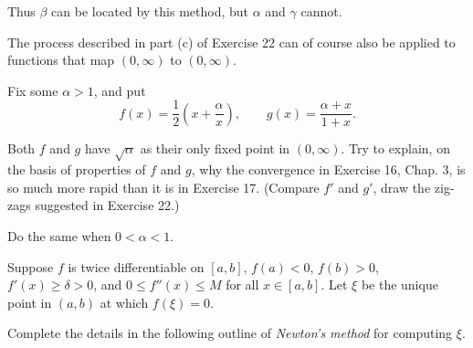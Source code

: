 \begin{questions}

  Thus $\beta$ can be located by this method, but $\alpha$ and $\gamma$ cannot.

  \question The process described in part (c) of Exercise 22 can of course also be applied to functions that map $(0,\infty)$ to $(0,\infty)$.

  Fix some $\alpha>1$, and put
  \[ f(x) = \frac{1}{2}\left( x + \frac{\alpha}{x} \right), \qquad g(x) = \frac{\alpha+x}{1+x}. \]

  Both $f$ and $g$ have $\sqrt{\alpha}$ as their only fixed point in $(0,\infty)$. Try to explain, on the basis of properties of $f$ and $g$, why the convergence in Exercise 16, Chap. 3, is so much more rapid than it is in Exercise 17. (Compare $f'$ and $g'$, draw the zig-zags suggested in Exercise 22.)

  Do the same when $0<\alpha<1$.

  \question Suppose $f$ is twice differentiable on $[a,b]$, $f(a)<0$, $f(b)>0$, $f'(x)\geq\delta>0$, and $0\leq f''(x)\leq M$ for all $x\in[a,b]$. Let $\xi$ be the unique point in $(a,b)$ at which $f(\xi)=0$.

  Complete the details in the following outline of \emph{Newton's method} for computing $\xi$.
\end{questions}
